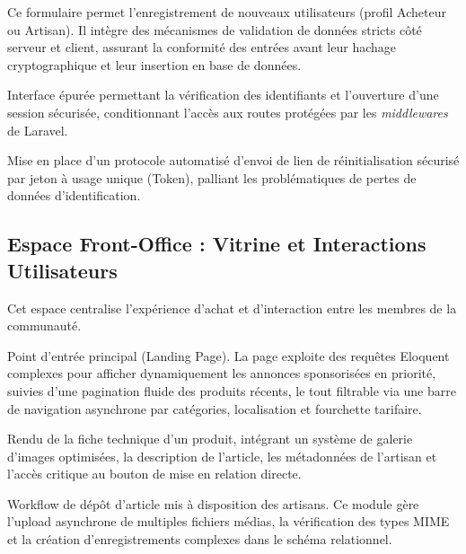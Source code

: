 Ce formulaire permet l'enregistrement de nouveaux utilisateurs (profil Acheteur ou Artisan). Il intègre des mécanismes de validation de données stricts côté serveur et client, assurant la conformité des entrées avant leur hachage cryptographique et leur insertion en base de données.


Interface épurée permettant la vérification des identifiants et l'ouverture d'une session sécurisée, conditionnant l'accès aux routes protégées par les \textit{middlewares} de Laravel.


Mise en place d'un protocole automatisé d'envoi de lien de réinitialisation sécurisé par jeton à usage unique (Token), palliant les problématiques de pertes de données d'identification.

\subsection{Espace Front-Office : Vitrine et Interactions Utilisateurs}
Cet espace centralise l'expérience d'achat et d'interaction entre les membres de la communauté.


Point d'entrée principal (Landing Page). La page exploite des requêtes Eloquent complexes pour afficher dynamiquement les annonces sponsorisées en priorité, suivies d'une pagination fluide des produits récents, le tout filtrable via une barre de navigation asynchrone par catégories, localisation et fourchette tarifaire.


Rendu de la fiche technique d'un produit, intégrant un système de galerie d'images optimisées, la description de l'article, les métadonnées de l'artisan et l'accès critique au bouton de mise en relation directe.


Workflow de dépôt d'article mis à disposition des artisans. Ce module gère l'upload asynchrone de multiples fichiers médias, la vérification des types MIME et la création d'enregistrements complexes dans le schéma relationnel.

